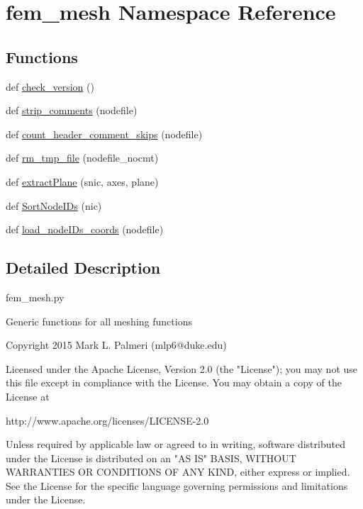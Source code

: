 \hypertarget{namespacefem__mesh}{}\section{fem\+\_\+mesh Namespace Reference}
\label{namespacefem__mesh}
\subsection*{Functions}
\begin{DoxyCompactItemize}
\item 
def \hyperlink{namespacefem__mesh_a54340024168d84ee90e2731de604b7c9}{check\+\_\+version} ()
\item 
def \hyperlink{namespacefem__mesh_acb8e341fc4a11a41122239e92e80ef25}{strip\+\_\+comments} (nodefile)
\item 
def \hyperlink{namespacefem__mesh_aecdc87300dbd7f57c9590be2eedfd4fd}{count\+\_\+header\+\_\+comment\+\_\+skips} (nodefile)
\item 
def \hyperlink{namespacefem__mesh_a482eed29183411d7e6275f9936210eca}{rm\+\_\+tmp\+\_\+file} (nodefile\+\_\+nocmt)
\item 
def \hyperlink{namespacefem__mesh_a9426734369dcc9c64d9076c9e64eb761}{extract\+Plane} (snic, axes, plane)
\item 
def \hyperlink{namespacefem__mesh_a5c79e3243c130de5fe8c49b64ce408b1}{Sort\+Node\+I\+Ds} (nic)
\item 
def \hyperlink{namespacefem__mesh_ac22e65233eb8ce28d6b9d61969697859}{load\+\_\+node\+I\+Ds\+\_\+coords} (nodefile)
\end{DoxyCompactItemize}


\subsection{Detailed Description}
\begin{DoxyVerb}fem_mesh.py

Generic functions for all meshing functions

Copyright 2015 Mark L. Palmeri (mlp6@duke.edu)

Licensed under the Apache License, Version 2.0 (the "License");
you may not use this file except in compliance with the License.
You may obtain a copy of the License at

http://www.apache.org/licenses/LICENSE-2.0

Unless required by applicable law or agreed to in writing, software
distributed under the License is distributed on an "AS IS" BASIS,
WITHOUT WARRANTIES OR CONDITIONS OF ANY KIND, either express or implied.
See the License for the specific language governing permissions and
limitations under the License.
\end{DoxyVerb}
 

